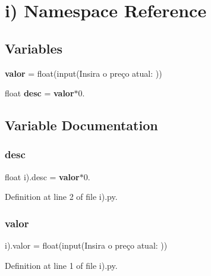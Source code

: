 \section{i) Namespace Reference}
\label{namespacei_08}
\subsection*{Variables}
\begin{DoxyCompactItemize}
\item 
\textbf{ valor} = float(input(\textquotesingle{}Insira o preço atual\+: \textquotesingle{}))
\item 
float \textbf{ desc} = \textbf{ valor}$\ast$0.
\end{DoxyCompactItemize}


\subsection{Variable Documentation}
\mbox{\label{namespacei_08_ad500b2fc5e4a259e790ae0772457b875}} 
\subsubsection{desc}
{\footnotesize\ttfamily float i).desc = \textbf{ valor}$\ast$0.}



Definition at line 2 of file i).\+py.

\mbox{\label{namespacei_08_a145e4090d8966fd6629849b6d3fbebdc}} 
\subsubsection{valor}
{\footnotesize\ttfamily i).valor = float(input(\textquotesingle{}Insira o preço atual\+: \textquotesingle{}))}



Definition at line 1 of file i).\+py.

